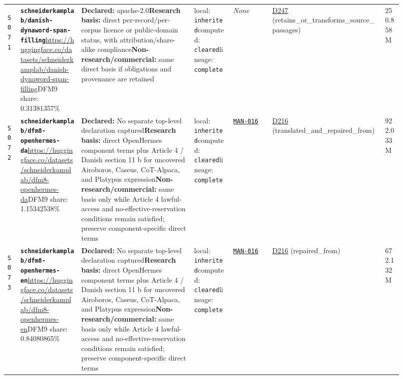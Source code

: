 \documentclass[9pt,a4paper]{article}
\newcommand{\srcid}[1]{\hypertarget{src:#1}{\texttt{#1}}}
\begin{document}
\begin{landscape}
\begin{longtable}{@{}L{0.03\linewidth}L{0.14\linewidth}L{0.26\linewidth}L{0.09\linewidth}L{0.09\linewidth}L{0.265\linewidth}L{0.045\linewidth}@{}}
\srcid{S071} & \textbf{\nolinkurl{schneiderkamplab/danish-dynaword-span-filling}}\newline \url{https://huggingface.co/datasets/schneiderkamplab/danish-dynaword-span-filling}\newline DFM9 share: 0.31381357\% & \textbf{Declared:} apache-2.0\newline \textbf{Research basis:} direct per-record/per-corpus licence or public-domain status, with attribution/share-alike compliance\newline \textbf{Non-research/commercial:} same direct basis if obligations and provenance are retained & local: \texttt{inherited}\newline computed: \texttt{cleared}\newline lineage: \texttt{complete} & \textit{None} & \hyperlink{dep:D247}{D247} (retains\_or\_transforms\_source\_passages) & 250.858M \\
\srcid{S072} & \textbf{\nolinkurl{schneiderkamplab/dfm8-openhermes-da}}\newline \url{https://huggingface.co/datasets/schneiderkamplab/dfm8-openhermes-da}\newline DFM9 share: 1.15342538\% & \textbf{Declared:} No separate top-level declaration captured\newline \textbf{Research basis:} direct OpenHermes component terms plus Article 4 / Danish section 11 b for uncovered Airoboros, Caseus, CoT-Alpaca, and Platypus expression\newline \textbf{Non-research/commercial:} same basis only while Article 4 lawful-access and no-effective-reservation conditions remain satisfied; preserve component-specific direct terms & local: \texttt{inherited}\newline computed: \texttt{cleared}\newline lineage: \texttt{complete} & \hyperlink{manual:MAN-016}{\texttt{MAN-016}} & \hyperlink{dep:D216}{D216} (translated\_and\_repaired\_from) & 922.033M \\
\srcid{S073} & \textbf{\nolinkurl{schneiderkamplab/dfm8-openhermes-en}}\newline \url{https://huggingface.co/datasets/schneiderkamplab/dfm8-openhermes-en}\newline DFM9 share: 0.84080865\% & \textbf{Declared:} No separate top-level declaration captured\newline \textbf{Research basis:} direct OpenHermes component terms plus Article 4 / Danish section 11 b for uncovered Airoboros, Caseus, CoT-Alpaca, and Platypus expression\newline \textbf{Non-research/commercial:} same basis only while Article 4 lawful-access and no-effective-reservation conditions remain satisfied; preserve component-specific direct terms & local: \texttt{inherited}\newline computed: \texttt{cleared}\newline lineage: \texttt{complete} & \hyperlink{manual:MAN-016}{\texttt{MAN-016}} & \hyperlink{dep:D216}{D216} (repaired\_from) & 672.132M \\

\end{longtable}
\end{landscape}
\end{document}
